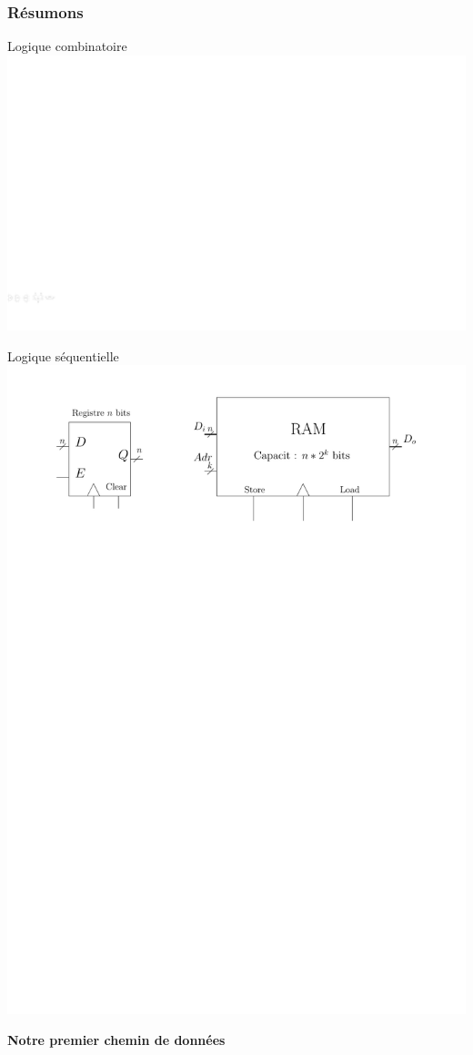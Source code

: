 \documentclass{beamer}
\begin{document}
\begin{frame}
\frametitle{Résumons}
\begin{block}{Logique combinatoire}
\centering\includegraphics[width=\linewidth]{Figs/circuits_logique_combinatoire.pdf}
\end{block}
\begin{block}{Logique séquentielle}
\centering\includegraphics[width=0.65\linewidth]{Figs/circuits_logique_sequentielle.pdf}
\end{block}
\end{frame}


\begin{frame}
\begin{center}
\textbf{Notre premier chemin de données}
\end{center}
\end{frame}
\end{document}
